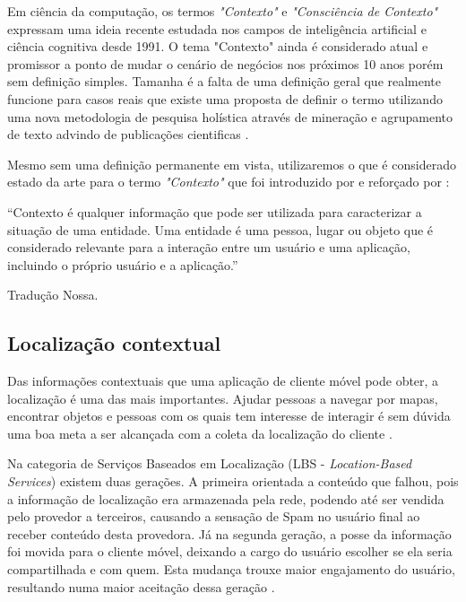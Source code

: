 Em ciência da computação, os termos \textit{"Contexto"} e \textit{"Consciência
de Contexto"} expressam uma ideia recente estudada nos campos de inteligência
artificial e ciência cognitiva desde 1991. O tema "Contexto" ainda é considerado
atual e promissor a ponto de mudar o cenário de negócios nos próximos 10 anos
porém sem definição simples. Tamanha é a falta de uma definição geral que
realmente funcione para casos reais que existe uma proposta de definir o termo
utilizando uma nova metodologia de pesquisa holística através de mineração e
agrupamento de texto advindo de publicações cientificas \cite{Pascalau2013}.


Mesmo sem uma definição permanente em vista, utilizaremos o que é considerado
estado da arte para o termo \textit{"Contexto"} que foi introduzido por
 e reforçado por :

\begin{citacao}

	``Contexto é qualquer informação que pode ser utilizada para caracterizar a
	situação de uma entidade. Uma entidade é uma pessoa, lugar ou objeto que é
	considerado relevante para a interação entre um usuário e uma aplicação,
	incluindo o próprio usuário e a aplicação.'' \

	 Tradução Nossa.
\end{citacao}

\subsection{Localização contextual}
\label{subsec:Localização contextual}

Das informações contextuais que uma aplicação de cliente móvel pode obter, a
localização é uma das mais importantes. Ajudar pessoas a navegar por mapas,
encontrar objetos e pessoas com os quais tem interesse de interagir é sem dúvida
uma boa meta a ser alcançada com a coleta da localização do cliente
\cite{Bellavista2008}.

Na categoria de Serviços Baseados em Localização (LBS - \textit{Location-Based
Services}) existem duas gerações. A primeira orientada a conteúdo que falhou,
pois a informação de localização era armazenada pela rede, podendo até ser
vendida pelo provedor a terceiros, causando a sensação de Spam no usuário final
ao receber conteúdo desta provedora. Já na segunda geração, a posse da
informação foi movida para o cliente móvel, deixando a cargo do usuário escolher
se ela seria compartilhada e com quem. Esta mudança trouxe maior engajamento do
usuário, resultando numa maior aceitação dessa geração \cite{Bellavista2008}.


